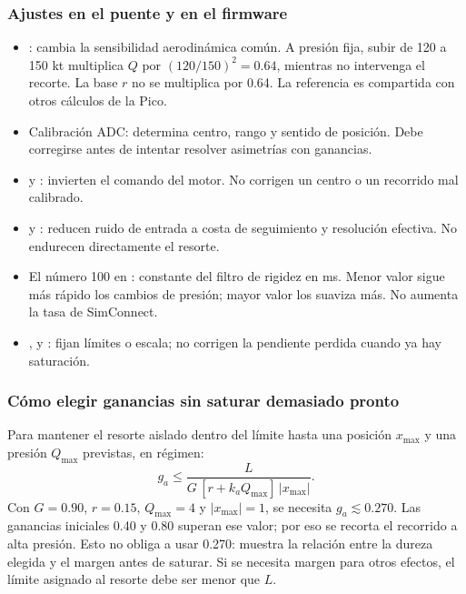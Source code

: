 \subsubsection{Ajustes en el puente y en el firmware}
\begin{itemize}
\item {}: cambia la sensibilidad aerodinámica común. A presión fija, subir de 120 a 150 kt multiplica $Q$ por $(120/150)^2=0.64$, mientras no intervenga el recorte. La base $r$ no se multiplica por 0.64. La referencia es compartida con otros cálculos de la Pico.
\item Calibración ADC: determina centro, rango y sentido de posición. Debe corregirse antes de intentar resolver asimetrías con ganancias.
\item {} y : invierten el comando del motor. No corrigen un centro o un recorrido mal calibrado.
\item {} y : reducen ruido de entrada a costa de seguimiento y resolución efectiva. No endurecen directamente el resorte.
\item El número 100 en : constante del filtro de rigidez en ms. Menor valor sigue más rápido los cambios de presión; mayor valor los suaviza más. No aumenta la tasa de SimConnect.
\item {},  y : fijan límites o escala; no corrigen la pendiente perdida cuando ya hay saturación.
\end{itemize}

\subsubsection{Cómo elegir ganancias sin saturar demasiado pronto}
Para mantener el resorte aislado dentro del límite hasta una posición $x_{\max}$ y una presión $Q_{\max}$ previstas, en régimen:
\begin{equation}
g_a\le\frac{L}{G\,[r+k_aQ_{\max}]\,|x_{\max}|}.
\end{equation}
Con $G=0.90$, $r=0.15$, $Q_{\max}=4$ y $|x_{\max}|=1$, se necesita $g_a\lesssim0.270$. Las ganancias iniciales 0.40 y 0.80 superan ese valor; por eso se recorta el recorrido a alta presión. Esto no obliga a usar 0.270: muestra la relación entre la dureza elegida y el margen antes de saturar. Si se necesita margen para otros efectos, el límite asignado al resorte debe ser menor que $L$.

